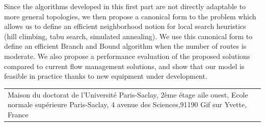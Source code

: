 \begin{mdframed}[linecolor=Prune,linewidth=1]
\begin{small}
\begin{multicols}{2}
Since the algorithms developed in this first part are not directly adaptable to more general topologies, we then propose a canonical form to the problem which allows us to define an efficient neighborhood notion for local search heuristics (hill climbing, tabu search, simulated annealing). We use this canonical form to define an efficient Branch and Bound algorithm when the number of routes is moderate.
We also propose a performance evaluation of the proposed solutions compared to current flow management solutions, and show that our model is feasible in practice thanks to new equipment under development.

\end{multicols}
\end{small}
\end{mdframed}
\vspace{9cm} %
\selectfont
\begin{tabular}{p{14cm}r}
\multirow{3}{16cm}[+0mm]{{\color{Prune} Maison du doctorat de l'Université Paris-Saclay, 2ème étage aile ouest, Ecole normale supérieure Paris-Saclay, 4 avenue des Sciences,91190 Gif sur Yvette, France}} 
\end{tabular}